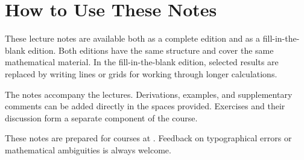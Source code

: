 \chapter*{How to Use These Notes}

These lecture notes are available both as a complete edition and as a
fill-in-the-blank edition. Both editions have the same structure and cover the
same mathematical material. In the fill-in-the-blank edition, selected results
are replaced by writing lines or grids for working through longer calculations.

The notes accompany the lectures. Derivations, examples, and supplementary
comments can be added directly in the spaces provided. Exercises and their
discussion form a separate component of the course.

These notes are prepared for courses at \Institution. Feedback on typographical
errors or mathematical ambiguities is always welcome.
